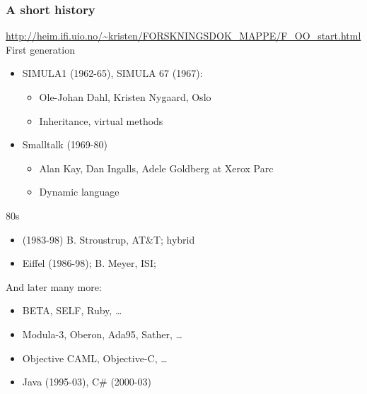 \documentclass{beamer}
\begin{document}
\begin{frame}[fragile]
\frametitle{A short history}
\url{http://heim.ifi.uio.no/~kristen/FORSKNINGSDOK_MAPPE/F_OO_start.html}
First generation
\begin{itemize}
\item SIMULA1 (1962-65), SIMULA 67 (1967): 
\begin{itemize}
\item Ole-Johan Dahl, Kristen Nygaard, Oslo
\item Inheritance, virtual methods
\end{itemize}
\item Smalltalk (1969-80) 
\begin{itemize}
\item Alan Kay, Dan Ingalls, Adele Goldberg at Xerox Parc
\item Dynamic language %
\end{itemize}
\end{itemize}

80s
\begin{itemize}
\item \cpp(1983-98)
B. Stroustrup, AT\&T; hybrid
\item Eiffel (1986-98); B. Meyer, ISI; %

\end{itemize}

And later many more:
\begin{itemize}
\item BETA, SELF, Ruby, \ldots
\item Modula-3, Oberon, Ada95, Sather, \ldots
\item Objective CAML, Objective-C, \ldots
\item Java (1995-03), C\# (2000-03)


\end{itemize}

\end{frame}
\end{document}
